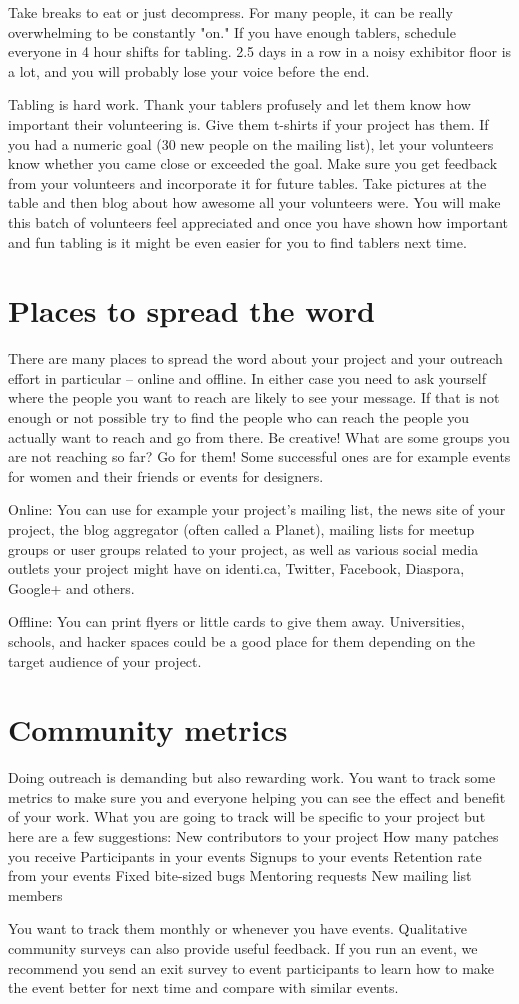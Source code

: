 Take breaks to eat or just decompress. For many people, it can be really overwhelming to be constantly "on." If you have enough tablers, schedule everyone in 4 hour shifts for tabling. 2.5 days in a row in a noisy exhibitor floor is a lot, and you will probably lose your voice before the end.

Tabling is hard work. Thank your tablers profusely and let them know how important their volunteering is. Give them t-shirts if your project has them. If you had a numeric goal (30 new people on the mailing list), let your volunteers know whether you came close or exceeded the goal. Make sure you get feedback from your volunteers and incorporate it for future tables. Take pictures at the table and then blog about how awesome all your volunteers were. You will make this batch of volunteers feel appreciated and once you have shown how important and fun tabling is it might be even easier for you to find tablers next time.

\section{Places to spread the word}
There are many places to spread the word about your project and your outreach effort in particular -- online and offline. In either case you need to ask yourself where the people you want to reach are likely to see your message. If that is not enough or not possible try to find the people who can reach the people you actually want to reach and go from there. Be creative! What are some groups you are not reaching so far? Go for them! Some successful ones are for example events for women and their friends or events for designers.

Online: You can use for example your project’s mailing list, the news site of your project, the blog aggregator (often called a Planet), mailing lists for meetup groups or user groups related to your project, as well as various social media outlets your project might have on identi.ca, Twitter, Facebook, Diaspora, Google+ and others.

Offline: You can print flyers or little cards to give them away. Universities, schools, and hacker spaces could be a good place for them depending on the target audience of your project.

\section{Community metrics}
Doing outreach is demanding but also rewarding work. You want to track some metrics to make sure you and everyone helping you can see the effect and benefit of your work. What you are going to track will be specific to your project but here are a few suggestions:
New contributors to your project
How many patches you receive
Participants in your events
Signups to your events
Retention rate from your events
Fixed bite-sized bugs
Mentoring requests
New mailing list members

You want to track them monthly or whenever you have events. Qualitative community surveys can also provide useful feedback. If you run an event, we recommend you send an exit survey to event participants to learn how to make the event better for next time and compare with similar events.
